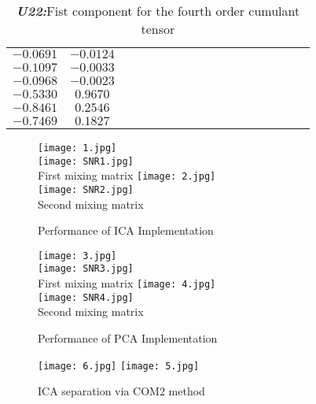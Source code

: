      
  \begin{table}[!htbp]
\centering
\caption{\textbf{\textit{U22:}}Fist component for the fourth order cumulant tensor}\label{a8}
\begin{tabular}{c c c c c c c c c c c c c c c c c} 
  \hline  
  \hline  
   $-0.0691$&$-0.0124$\\
   $-0.1097$&$-0.0033$\\
   $-0.0968$&$-0.0023$\\
 \hline
 \hline  
   $-0.5330$&$ 0.9670$\\
   $-0.8461$&$ 0.2546$\\
   $-0.7469$&$ 0.1827$\\
 \hline
   
 \hline
\end{tabular}
\end{table}

\begin{figure}[!htbp]
%
\centering
\texttt{[image: 1.jpg]}\\
\texttt{[image: SNR1.jpg]}\\
\tiny{First mixing matrix}\label{a1}
\endminipage\hfill
{}%
\centering
\texttt{[image: 2.jpg]}\\
\texttt{[image: SNR2.jpg]}\\
\tiny{Second mixing matrix}\label{a2}
\endminipage\hfill
\caption{\tiny Performance of ICA Implementation}\label{a1}
\end{figure}



\begin{figure}[!htbp]
%
\centering
\texttt{[image: 3.jpg]}\\
\texttt{[image: SNR3.jpg]}\\
\tiny{First mixing matrix}\label{a3}
\endminipage\hfill
{}%
\centering
\texttt{[image: 4.jpg]}\\
\texttt{[image: SNR4.jpg]}\\
\tiny{Second mixing matrix}\label{a4}
\endminipage\hfill
\caption{\tiny Performance of PCA Implementation}\label{a2}
\end{figure}


\begin{figure}[!htbp]
%
\centering
\texttt{[image: 6.jpg]}
\label{a9}
\endminipage\hfill
{}%
\centering
\texttt{[image: 5.jpg]}
\label{a10}
\endminipage\hfill
\caption{ICA separation via COM2 method}
\end{figure}



